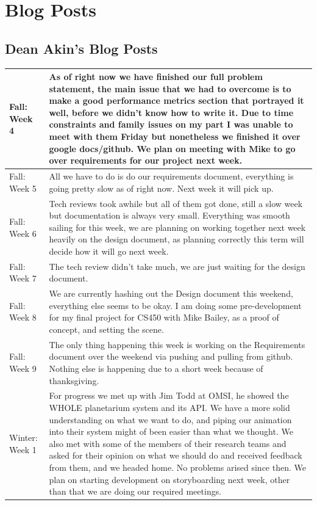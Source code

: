 \documentclass[onecolumn, draftclsnofoot,10pt, compsoc]{IEEEtran}
\begin{document}
\section{Blog Posts}
\subsection* {Dean Akin's Blog Posts}
\begin{longtable} {|p{1.5cm}|p{13.5cm}|} \hline
Fall: Week 4 &
As of right now we have finished our full problem statement, the main issue that we had to overcome is to make a good performance metrics section that portrayed it well, before we didn’t know how to write it. Due to time constraints and family issues on my part I was unable to meet with them Friday but nonetheless we finished it over google docs/github. We plan on meeting with Mike to go over requirements for our project next week. \\ \hline

Fall: Week 5 &
All we have to do is do our requirements document, everything is going pretty slow as of right now. Next week it will pick up. \\ \hline

Fall: Week 6 &
Tech reviews took awhile but all of them got done, still a slow week but documentation is always very small. Everything was smooth sailing for this week, we are planning on working together next week heavily on the design document, as planning correctly this term will decide how it will go next week.  \\ \hline

Fall: Week 7 &
The tech review didn’t take much, we are just waiting for the design document. \\ \hline

Fall: Week 8 &
We are currently hashing out the Design document this weekend, everything else seems to be okay. I am doing some pre-development for my final project for CS450 with Mike Bailey, as a proof of concept, and setting the scene. \\ \hline

Fall: Week 9 &
The only thing happening this week is working on the Requirements document over the weekend via pushing and pulling from github. Nothing else is happening due to a short week because of thanksgiving.  \\ \hline

Winter: Week 1 &
For progress we met up with Jim Todd at OMSI, he showed the WHOLE planetarium system and its API. We have a more solid understanding on what we want to do, and piping our animation into their system might of been easier than what we thought. We also met with some of the members of their research teams and asked for their opinion on what we should do and received feedback from them, and we headed home. No problems arised since then. We plan on starting development on storyboarding next week, other than that we are doing our required meetings.  \\ \hline


\end{longtable}
\end{document}

